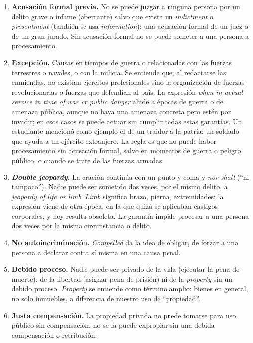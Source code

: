 \documentclass[12pt,oneside]{book}
\begin{document}
\begin{enumerate}
    \item \textbf{Acusación formal previa.} No se puede juzgar a ninguna persona por un delito grave o infame (aberrante) salvo que exista un \textit{indictment} o \textit{presentment} (también se usa \textit{information}): una acusación formal de un juez o de un gran jurado. Sin acusación formal no se puede someter a una persona a procesamiento.
    \item \textbf{Excepción.} Causas en tiempos de guerra o relacionadas con las fuerzas terrestres o navales, o con la milicia. Se entiende que, al redactarse las enmiendas, no existían ejércitos profesionales sino la organización de fuerzas revolucionarias o fuerzas que defendían al país. La expresión \textit{when in actual service in time of war or public danger} alude a épocas de guerra o de amenaza pública, aunque no haya una amenaza concreta pero estén por invadir; en esos casos se puede actuar sin cumplir todas estas garantías. Un estudiante mencionó como ejemplo el de un traidor a la patria: un soldado que ayuda a un ejército extranjero. La regla es que no puede haber procesamiento sin acusación formal, salvo en momentos de guerra o peligro público, o cuando se trate de las fuerzas armadas.
    \item \textbf{\textit{Double jeopardy}.} La oración continúa con un punto y coma y \textit{nor shall} (``ni tampoco''). Nadie puede ser sometido dos veces, por el mismo delito, a \textit{jeopardy of life or limb}. \textit{Limb} significa brazo, pierna, extremidades; la expresión viene de otra época, en la que quizá se aplicaban castigos corporales, y hoy resulta obsoleta. La garantía impide procesar a una persona dos veces por la misma circunstancia o delito.
    \item \textbf{No autoincriminación.} \textit{Compelled} da la idea de obligar, de forzar a una persona a declarar contra sí misma en una causa penal.
    \item \textbf{Debido proceso.} Nadie puede ser privado de la vida (ejecutar la pena de muerte), de la libertad (asignar pena de prisión) ni de la \textit{property} sin un debido proceso. \textit{Property} se entiende como término amplio: bienes en general, no solo inmuebles, a diferencia de nuestro uso de ``propiedad''.
    \item \textbf{Justa compensación.} La propiedad privada no puede tomarse para uso público sin compensación: no se la puede expropiar sin una debida compensación o retribución.
\end{enumerate}
\end{document}
